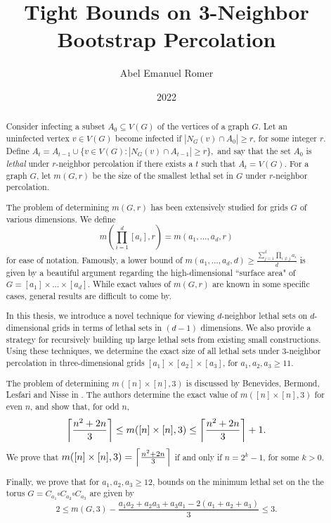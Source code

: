 \documentclass[12pt,oneside]{sigmasthesis}
\title{Tight Bounds on 3-Neighbor Bootstrap Percolation}			%
\author{Abel Emanuel Romer}			%
\date{2022}				%
\DeclarePairedDelimiter\ceil{\lceil}{\rceil}
\theoremstyle{definition}
\begin{document}
\frontmatter 	%


\makecommittee	%

\begin{abstract}
Consider infecting a subset $A_0 \subseteq V(G)$ of the vertices of a graph $G$. Let an uninfected vertex $v \in V(G)$ become infected if $|N_G(v) \cap A_0| \geq r$, for some integer $r$. Define $A_t = A_{t-1} \cup \{v \in V(G) : |N_G(v) \cap A_{t-1}| \geq r \},$ and say that the set $A_0$ is \emph{lethal} under $r$-neighbor percolation if there exists a $t$ such that $A_t = V(G)$. For a graph $G$, let $m(G,r)$ be the size of the smallest lethal set in $G$ under $r$-neighbor percolation. 

The problem of determining $m(G,r)$ has been extensively studied for grids $G$ of various dimensions. We define 
$$m\left (\prod_{i=1}^d [a_i], r\right ) = m(a_1, \dots, a_d, r)$$
for ease of notation. Famously, a lower bound of $m(a_1, \dots, a_d, d) \geq \frac{\sum_{j=1}^d \prod_{i \neq j} a_i}{d}$ is given by a beautiful argument regarding the high-dimensional ``surface area" of $G = [a_1] \times \dots \times [a_d]$. While exact values of $m(G,r)$ are known in some specific cases, general results are difficult to come by.

In this thesis, we introduce a novel technique for viewing $d$-neighbor lethal sets on $d$-dimensional grids in terms of lethal sets in $(d-1)$ dimensions. We also provide a strategy for recursively building up large lethal sets from existing small constructions. Using these techniques, we determine the exact size of all lethal sets under 3-neighbor percolation in three-dimensional grids $[a_1] \times [a_2] \times [a_3]$, for $a_1,a_2,a_3 \geq 11$. 

The problem of determining $m([n] \times [n],3)$ is discussed by Benevides, Bermond, Lesfari and Nisse in \cite{benevides:2021}. The authors determine the exact value of $m([n] \times [n],3)$ for even $n$, and show that, for odd $n$,
$$\ceil*{\frac{n^2+2n}{3}} \leq m([n] \times [n],3) \leq \ceil*{\frac{n^2+2n}{3}} + 1.$$
We prove that $m([n] \times [n],3) = \ceil*{\frac{n^2+2n}{3}}$ if and only if $n = 2^k-1$, for some $k >0$.

Finally, we prove that for $a_1,a_2,a_3 \geq 12$, bounds on the minimum lethal set on the the torus $G = C_{a_1} \square C_{a_2} \square C_{a_3}$ are given by
$$2 \le m(G,3) - \frac{a_1a_2 + a_2a_3 + a_3a_1 -2(a_1+a_2+a_3)}{3} \le 3.$$
\end{abstract}
\end{document}
